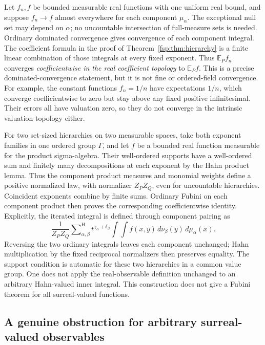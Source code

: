 \documentclass[11pt,a4paper]{article}
\numberwithin{equation}{section}
\theoremstyle{definition}
\theoremstyle{remark}
\newcommand{\E}{\mathbb E}
\newcommand{\hsum}{\mathop{\sum}\nolimits^{\mathrm H}}
\begin{document}
Let $f_n,f$ be bounded measurable real functions with one uniform real
bound, and suppose $f_n\to f$ almost everywhere for each component
$\mu_\alpha$. The exceptional null set may depend on $\alpha$;
no uncountable intersection of full-measure sets is needed. Ordinary
dominated convergence gives convergence of each component integral.
The coefficient formula in the proof of Theorem~\ref{fsp:thm:hierarchy}
is a finite linear combination of those integrals at every fixed exponent.
Thus $\E_Pf_n$ converges
\emph{coefficientwise in the real coefficient topology} to $\E_Pf$.
This is a precise dominated-convergence statement, but it is not fine
or ordered-field convergence. For example, the constant functions
$f_n=1/n$ have expectations $1/n$, which converge coefficientwise to
zero but stay above any fixed positive infinitesimal. Their errors all
have valuation zero, so they do not converge in the intrinsic valuation
topology either.

For two set-sized hierarchies on two measurable spaces, take both exponent
families in one ordered group $\Gamma$, and let $f$ be a bounded real
function measurable for the product sigma-algebra. Their well-ordered
supports have a well-ordered sum and finitely many decompositions at each
exponent by the Hahn product lemma. Thus the component product measures
and monomial weights define a positive normalized law, with normalizer
$Z_PZ_Q$, even for uncountable hierarchies. Coincident exponents combine
by finite sums. Ordinary Fubini on each component product then proves
the corresponding coefficientwise identity. Explicitly, the iterated
integral is defined through component pairing as
\begin{equation}
 \frac{1}{Z_PZ_Q}\hsum_{\alpha,\beta}
 t^{\gamma_\alpha+\delta_\beta}
 \int\!\int f(x,y)\,d\nu_\beta(y)\,d\mu_\alpha(x).
\end{equation}
Reversing the two ordinary integrals leaves each component unchanged;
Hahn multiplication by the fixed reciprocal normalizers then preserves
equality. The support condition is automatic for these two hierarchies
in a common value group. One does not apply the real-observable definition
unchanged to an arbitrary Hahn-valued inner integral. This construction
does not give a Fubini theorem for all surreal-valued functions.

\subsection{A genuine obstruction for arbitrary surreal-valued observables}
\end{document}
